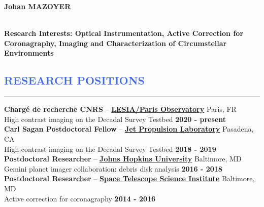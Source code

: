 \documentclass[12pt]{article}
\begin{document}
\lhead[]{}

\begin{huge}
\noindent\textbf{Johan MAZOYER}
\end{huge}\\


\textbf{Research Interests: Optical Instrumentation, Active Correction for Coronagraphy, Imaging and Characterization of Circumstellar Environments}\\


\vspace{-1cm}
\textcolor{RoyalBlue}{\section{\large RESEARCH POSITIONS}
\vspace{-0.35cm}\hrule}
\vspace{0.4cm}

\textbf{Chargé de recherche CNRS} -- \href{http://www.obspm.fr/?lang=en}{\textbf{LESIA/Paris Observatory}} \hfill       { Paris, FR} \\
{\small High contrast imaging on the Decadal Survey Testbed}  \hfill  	 { \bf 2020 - present}\\


\textbf{Carl Sagan Postdoctoral Fellow} -- \href{https://www.jpl.nasa.gov/}{\textbf{Jet Propulsion Laboratory}} \hfill       { Pasadena, CA} \\
{\small High contrast imaging on the Decadal Survey Testbed}  \hfill  	 { \bf 2018 - 2019}\\


\textbf{Postdoctoral Researcher} -- \href{http://physics-astronomy.jhu.edu/}{\textbf{Johns Hopkins University}} \hfill       { Baltimore, MD} \\
{\small Gemini planet imager collaboration: debris disk analysis}  \hfill  	 { \bf 2016 - 2018}\\


\textbf{Postdoctoral Researcher} -- {\href{http://www.stsci.edu}{\textbf{Space Telescope Science Institute}}} \hfill       { Baltimore, MD} \\
{\small Active correction for coronagraphy}  \hfill  	 { \bf 2014 - 2016}\\
\end{document}
